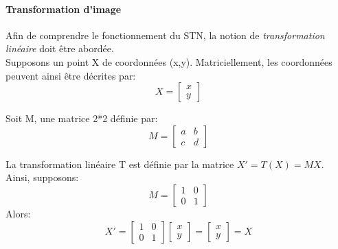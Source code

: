 \paragraph{Transformation d'image}
Afin de comprendre le fonctionnement du STN, la notion de \textit{transformation linéaire} doit être abordée.\\

\noindent Supposons un point X de coordonnées (x,y). Matriciellement, les coordonnées peuvent ainsi être décrites par:
$$X=\begin{bmatrix}
x \\
y
\end{bmatrix}$$

\noindent Soit M, une matrice 2*2 définie par:
$$M=\begin{bmatrix}
a & b \\
c & d
\end{bmatrix}$$

\noindent La transformation linéaire T est définie par la matrice $X'= T(X) = MX$.\\

\noindent Ainsi, supposons:
$$M=\begin{bmatrix}
1 & 0 \\
0 & 1
\end{bmatrix}$$
\noindent Alors:
$$X'=\begin{bmatrix}
1 & 0 \\
0 & 1
\end{bmatrix}\begin{bmatrix}
x \\
y
\end{bmatrix}=\begin{bmatrix}
x \\
y
\end{bmatrix}=X$$

